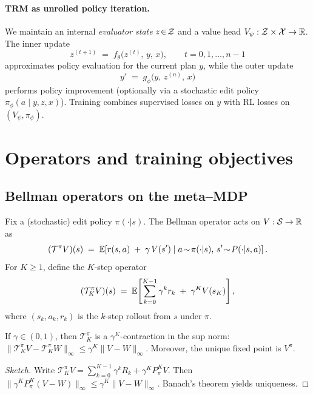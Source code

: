 \documentclass[11pt]{article}
\begin{document}
\paragraph{TRM as unrolled policy iteration.}
We maintain an internal \emph{evaluator state} $z\!\in\!\mathcal{Z}$ and a value head $V_\psi:\mathcal{Z}\times\mathcal{X}\to\mathbb{R}$. The inner update
\begin{equation}
    z^{(t+1)} \;=\; f_\theta\!\bigl(z^{(t)},\,y,\,x\bigr),\qquad t=0,1,\dots,n-1
    \label{eq:inner}
\end{equation}
approximates policy evaluation for the current plan $y$, while the outer update
\begin{equation}
    y' \;=\; g_\phi\!\bigl(y,\,z^{(n)},\,x\bigr)
    \label{eq:outer}
\end{equation}
performs policy improvement (optionally via a stochastic edit policy $\pi_\phi(a\mid y,z,x)$). Training combines supervised losses on $y$ with RL losses on $(V_\psi,\pi_\phi)$.

\section{Operators and training objectives}

\subsection{Bellman operators on the meta--MDP}
Fix a (stochastic) edit policy $\pi(\cdot|s)$. The Bellman operator acts on $V:\mathcal{S}\to\mathbb{R}$ as
\begin{equation}
   (\mathcal{T}^\pi V)(s)\;=\;\mathbb{E}\!\left[r(s,a)\;+\;\gamma\,V(s') \;\middle|\; a\!\sim\!\pi(\cdot|s),\, s'\!\sim\!P(\cdot|s,a)\right].
\end{equation}
For $K\!\ge\!1$, define the $K$-step operator
\begin{equation}
 (\mathcal{T}^\pi_K V)(s)\;=\;\mathbb{E}\!\left[\sum_{k=0}^{K-1}\gamma^k r_k\;+\;\gamma^K V(s_K)\right],
 \label{eq:Kstep}
\end{equation}
where $(s_k,a_k,r_k)$ is the $k$-step rollout from $s$ under $\pi$.

\begin{lemma}\label{lem:Kstep_contraction}
If $\gamma\in(0,1)$, then $\mathcal{T}^\pi_K$ is a $\gamma^K$-contraction in the sup norm:
$\|\mathcal{T}^\pi_K V-\mathcal{T}^\pi_K W\|_\infty \le \gamma^K \|V-W\|_\infty$.
Moreover, the unique fixed point is $V^\pi$.
\end{lemma}
\begin{proof}[Sketch]
Write $\mathcal{T}^\pi_K V=\sum_{k=0}^{K-1}\gamma^k R_k+\gamma^K P_\pi^K V$. Then
$\|\gamma^K P_\pi^K(V-W)\|_\infty\le \gamma^K\|V-W\|_\infty$. Banach's theorem yields uniqueness.
\end{proof}
\end{document}
